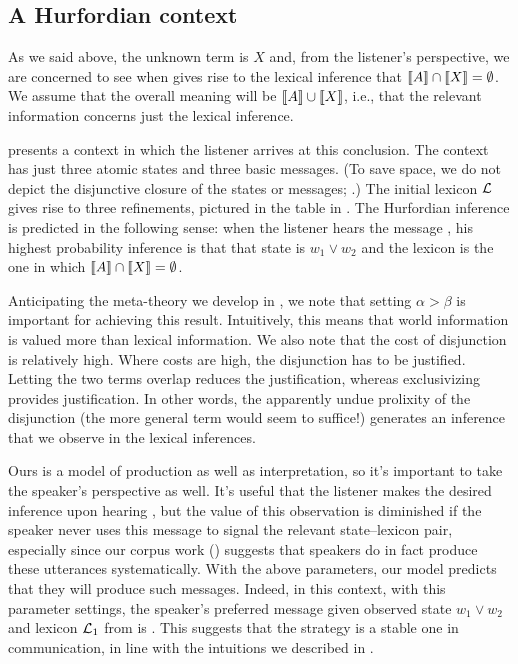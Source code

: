 \documentclass{article}
\begin{document}

\subsection{A Hurfordian context}\label{sec:analysis:subsumptive}

As we said above, the unknown term is $X$ and, from the listener's
perspective, we are concerned to see when  gives rise to
the lexical inference that $\llbracket A\rrbracket \cap \llbracket X\rrbracket = \emptyset$. We
assume that the overall meaning will be $\llbracket A\rrbracket \cup \llbracket X\rrbracket$, i.e.,
that the relevant information concerns just the lexical inference.

 presents a context in which the listener arrives
at this conclusion. The context has just three atomic states and three
basic messages. (To save space, we do not depict the disjunctive
closure of the states or messages; .) The
initial lexicon $\mathcal{L}$ gives rise to three refinements, pictured in
the table in . The Hurfordian inference is
predicted in the following sense: when the listener hears the message
, his highest probability inference is that that state is
$w_{1} \vee w_{2}$ and the lexicon is the one in which
$\llbracket A\rrbracket \cap \llbracket X\rrbracket = \emptyset$.

Anticipating the meta-theory we develop in
, we note that setting
$\alpha > \beta$ is important for achieving this result. Intuitively,
this means that world information is valued more than lexical
information. We also note that the cost of disjunction is relatively
high. Where costs are high, the disjunction has to be
justified. Letting the two terms overlap reduces the justification,
whereas exclusivizing provides justification. In other words, the
apparently undue prolixity of the disjunction (the more general term
would seem to suffice!) generates an inference that we observe in the
lexical inferences.

Ours is a model of production as well as interpretation, so it's
important to take the speaker's perspective as well. It's useful that
the listener makes the desired inference upon hearing ,
but the value of this observation is diminished if the speaker never
uses this message to signal the relevant state--lexicon pair,
especially since our corpus work ()
suggests that speakers do in fact produce these utterances
systematically. With the above parameters, our model predicts that
they will produce such messages. Indeed, in this context, with this
parameter settings, the speaker's preferred message given observed
state $w_{1} \vee w_{2}$ and lexicon $\mathcal{L}_{1}$ from
 is .  This suggests that the
strategy is a stable one in communication, in line with the intuitions
we described in .
\end{document}
